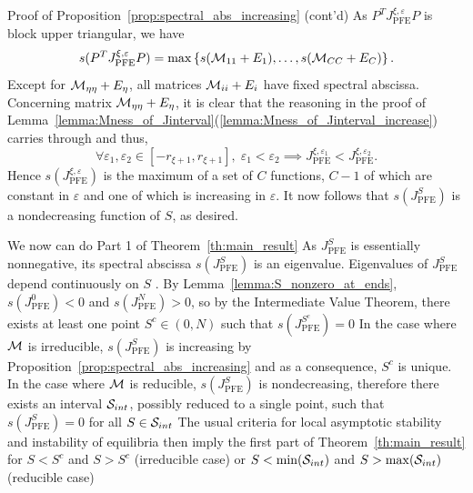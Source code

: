 \documentclass[aspectratio=169]{beamer}
\begin{document}
\begin{frame}{Proof of Proposition~\ref{prop:spectral_abs_increasing} (cont'd)}
	As $P^TJ_{\textrm{PFE}}^{\xi,\varepsilon}P$ is block upper triangular, we have
	\[
	s(P^TJ_{\textrm{PFE}}^{\xi,\varepsilon}P)
	=
	\max\left\{s(\M_{11}+E_1),\ldots,s(\M_{CC}+E_C)\right\}.
	\]
	Except for $\M_{\eta\eta}+E_\eta$, all matrices $\M_{ii}+E_i$ have fixed spectral abscissa.
	Concerning matrix $\M_{\eta\eta}+E_\eta$, it is clear that the reasoning in the proof of Lemma~\ref{lemma:Mness_of_Jinterval}(\ref{lemma:Mness_of_Jinterval_increase}) carries through and thus,
	\[
	\forall \varepsilon_1,\varepsilon_2\in[-r_{\xi+1},r_{\xi+1}],
	\;
	\varepsilon_1<\varepsilon_2
	\implies
	J_{\textrm{PFE}}^{\xi,\varepsilon_1}
	< J_{\textrm{PFE}}^{\xi,\varepsilon_2}.
	\]
	Hence $s(J_{\textrm{PFE}}^{\xi,\varepsilon})$ is the maximum of a set of $C$ functions, $C-1$ of which are constant in $\varepsilon$ and one of which is increasing in $\varepsilon$. 
	It now follows that $s(J_{\textrm{PFE}}^S)$ is a nondecreasing function of $S$, as desired. 
\end{frame}

\begin{frame}{We now can do Part 1 of Theorem~\ref{th:main_result}}
	As $J_{\textrm{PFE}}^S$ is essentially nonnegative, its spectral abscissa $s(J_{\textrm{PFE}}^S)$ is an eigenvalue.
	Eigenvalues of $J_{\textrm{PFE}}^S$ depend continuously on $S$ \cite[Theorem 2.4.9.2]{HornJohnson2013}. By Lemma~\ref{lemma:S_nonzero_at_ends}, $s(J_{\textrm{PFE}}^0)<0$ and $s(J_{\textrm{PFE}}^N)>0$, so by the Intermediate Value Theorem, there exists at least one point $S^c\in(0,N)$ such that $s(J_{\textrm{PFE}}^{S^c})=0$
	\vfill
	In the case where $\M$ is irreducible, $s(J_{\textrm{PFE}}^S)$ is increasing by Proposition~\ref{prop:spectral_abs_increasing} and as a consequence, $S^c$ is unique. In the case where $\M$ is reducible, $s(J_{\textrm{PFE}}^S)$ is nondecreasing, therefore there exists an interval $\S_{int}$, possibly reduced to a single point, such that $s(J_{\textrm{PFE}}^S)=0$ for all $S\in\S_{int}$
	\vfill
	The usual criteria for local asymptotic stability and instability of equilibria then imply the first part of Theorem~\ref{th:main_result} for $S<S^c$ and $S>S^c$ (irreducible case) or $S<\min(\S_{int})$ and $S>\max(\S_{int})$ (reducible case)
\end{frame}
\end{document}
